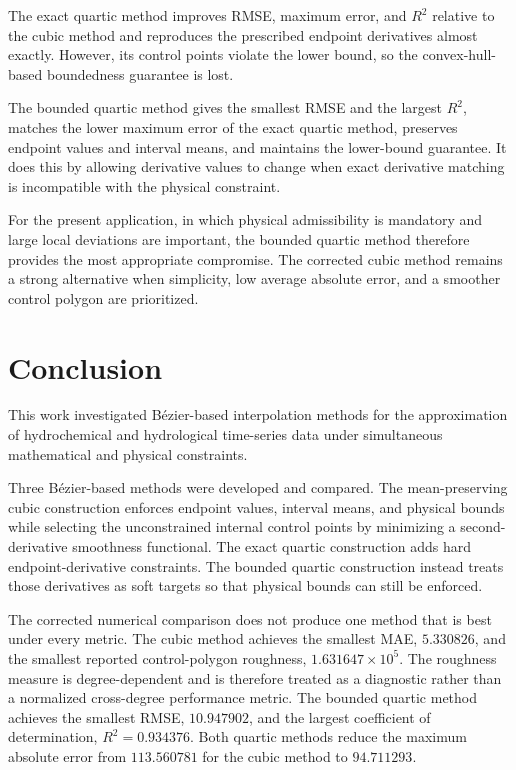 \documentclass[12pt,a4paper]{article}
\begin{document}
The exact quartic method improves RMSE, maximum error, and \(R^2\) relative to
the cubic method and reproduces the prescribed endpoint derivatives almost
exactly. However, its control points violate the lower bound, so the
convex-hull-based boundedness guarantee is lost.

The bounded quartic method gives the smallest RMSE and the largest \(R^2\),
matches the lower maximum error of the exact quartic method, preserves
endpoint values and interval means, and maintains the lower-bound guarantee.
It does this by allowing derivative values to change when exact derivative
matching is incompatible with the physical constraint.

For the present application, in which physical admissibility is mandatory and
large local deviations are important, the bounded quartic method therefore
provides the most appropriate compromise. The corrected cubic method remains
a strong alternative when simplicity, low average absolute error, and a
smoother control polygon are prioritized.

\newpage
\section{Conclusion}
This work investigated B\'ezier-based interpolation methods for the
approximation of hydrochemical and hydrological time-series data under
simultaneous mathematical and physical constraints.

Three B\'ezier-based methods were developed and compared. The mean-preserving
cubic construction enforces endpoint values, interval means, and physical
bounds while selecting the unconstrained internal control points by minimizing
a second-derivative smoothness functional. The exact quartic construction
adds hard endpoint-derivative constraints. The bounded quartic construction
instead treats those derivatives as soft targets so that physical bounds can
still be enforced.

The corrected numerical comparison does not produce one method that is best
under every metric. The cubic method achieves the smallest MAE,
\(5.330826\), and the smallest reported control-polygon roughness,
\(1.631647\times 10^{5}\). The roughness measure is degree-dependent and is
therefore treated as a diagnostic rather than a normalized cross-degree
performance metric. The bounded quartic method achieves the smallest
RMSE, \(10.947902\), and the largest coefficient of determination,
\(R^2=0.934376\). Both quartic methods reduce the maximum absolute error from
\(113.560781\) for the cubic method to \(94.711293\).
\end{document}

